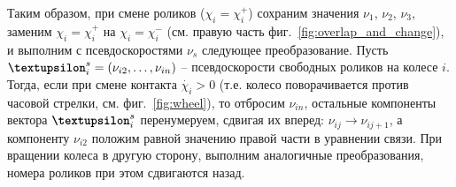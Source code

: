 Таким образом, при смене роликов ($\chi_i = \chi_i^+$) сохраним значения $\nu_1$, $\nu_2$, $\nu_3$, заменим $\chi_i = \chi_i^+$ на $\chi_i = \chi_i^-$ (см. правую часть фиг.~\ref{fig:overlap_and_change}), и выполним с псевдоскоростями $\nu_s$ следующее преобразование. Пусть $\vnu_i^s = (\nu_{i2},\ldots,\nu_{in})$ -- псевдоскорости свободных роликов на колесе $i$. Тогда, если при смене контакта $\dot{\chi_i} > 0$ (т.е. колесо поворачивается против часовой стрелки, см. фиг.~\ref{fig:wheel}), то отбросим $\nu_{in}$, остальные компоненты вектора $\vnu_i^s$ перенумеруем, сдвигая их вперед: $\nu_{ij} \rightarrow \nu_{ij+1}$, а компоненту $\nu_{i2}$ положим равной значению правой части в уравнении связи. При вращении колеса в другую сторону, выполним аналогичные преобразования, номера роликов при этом сдвигаются назад.
